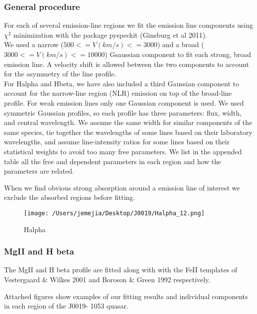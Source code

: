 \documentclass[usenatbib]{mn2e}
\begin{document}
\subsubsection{General procedure}
For each of several emission-line regions we fit the emission line components using $\chi^2$ minimization with the package pyspeckit (Ginsburg et al 2011).
\\
We used a narrow ($500<=V(km/s)<=3000$) and a broad ($3000<=V(km/s)<=10000$) Gsaussian component to fit each strong, broad emission line. A velocity shift is allowed between the two components to account for the asymmetry of the line profile.
\\
For Halpha and Hbeta, we have also included a third Gaussian component to account for the  narrow-line region (NLR) emission on top of the broad-line profile. For weak emission lines only  one Gaussian component is used.
We used symmetric Gaussian profiles, so each profile has three parameters: flux, width, and central wavelength. We assume the same width for similar components of the same species, tie together the wavelengths of some lines based on their laboratory wavelengths, and assume line-intensity ratios for some lines based on their statistical weights  to avoid too many free parameters. We list in the appended table  all the free and dependent parameters in each region and how the parameters are related. 

When we find obvious strong absorption around a emission line of interest we exclude the absorbed regions before fitting. 

\begin{figure*}
\begin{center}
\texttt{[image: /Users/jemejia/Desktop/J0019/Halpha\_12.png]}
\vspace{5mm}
\end{center} 
\caption{Halpha \label{fig:landscape}}   
\end{figure*}


\subsubsection{MgII and H beta}

The MgII and H beta profile are fitted along with with the FeII templates of Vestergaard \& Wilkes 2001  and Boroson \& Green 1992 respectively.

Attached figures  show examples of our fitting results and individual components in each region of the J0019-
1053 quasar. 
\end{document}
